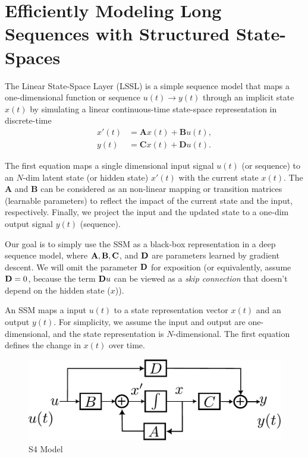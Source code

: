 
\section{Efficiently Modeling Long Sequences with Structured State-Spaces}
\label{sec:nlp_ssm}
The Linear State-Space Layer (LSSL) is a simple sequence model that maps a one-dimensional function  or sequence $u(t)\to y(t)$ through an implicit state $x(t)$ by simulating a linear continuous-time state-space representation in discrete-time
\begin{align*}
	x'(t) &= \mathbf{A}x(t)+\mathbf{B}u(t),\\
	y(t) &= \mathbf{C}x(t)+\mathbf{D}u(t).
\end{align*}

The first equation maps a single dimensional input signal $u(t)$ (or sequence) to an $N$-dim latent state (or hidden state) $x'(t)$ with the current state $x(t)$. The $\mathbf{A}$ and $\mathbf{B}$ can be considered as an non-linear mapping or transition matrices (\ie learnable parameters) to reflect the impact of the current state and the input, respectively. Finally, we project the input and the updated state to a one-dim output signal $y(t)$ (\ie sequence).  

Our goal is to simply use the SSM as a black-box representation in a deep sequence model, where ${\mathbf{A}}, {\mathbf{B}}, {\mathbf{C}}$, and ${\mathbf{D}}$ are parameters learned by gradient descent. We will omit the parameter ${\mathbf{D}}$ for exposition (or equivalently, assume ${\mathbf{D}}=0$, because the term ${\mathbf{D}} u$ can be viewed as a \textit{skip connection} that doesn't depend on the hidden state ($x$)).

An SSM maps a input $u(t)$ to a state representation vector $x(t)$ and an output $y(t)$. For simplicity, we assume the input and output are one-dimensional, and the state representation is $N$-dimensional. The first equation defines the change in $x(t)$ over time.

\begin{figure}[t]
	\centering
	\includegraphics[scale=0.6]{./images/nlp/ssm.pdf}
	\caption{S4 Model}
	\label{fig:nlp_s4_model}
\end{figure}

